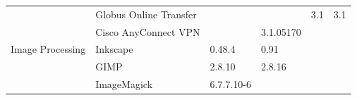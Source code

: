 \begin{table}[!ht]
{\begin{tabular}{|ll|l|l|l|l|}
\rowcolor{black!5}
\cellcolor{white}                                                      & \multicolumn{1}{|l|}{Globus Online Transfer} &                                                                     &                                                                   & 3.1                                                                    & 3.1                                            \\
\rowcolor{black!10}
\cellcolor{white}                                                      & \multicolumn{1}{|l|}{Cisco AnyConnect VPN}   &                                                                     & 3.1.05170                                                         &                                                                        &                                                \\
\hline
\rowcolor{black!5}
\cellcolor{white} Image Processing                                     & \multicolumn{1}{|l|}{Inkscape}               & 0.48.4                                                              & 0.91                                                              &                                                                        &                                                \\
\rowcolor{black!10}
\cellcolor{white}                                                      & \multicolumn{1}{|l|}{GIMP}                   & 2.8.10                                                              & 2.8.16                                                            &                                                                        &                                                \\
\rowcolor{black!5}
\cellcolor{white}                                                      & \multicolumn{1}{|l|}{ImageMagick}            & 6.7.7.10-6                                                          &                                                                   &                                                                        &                                                \\
\hline                                
\end{tabular}
}
\end{table}

